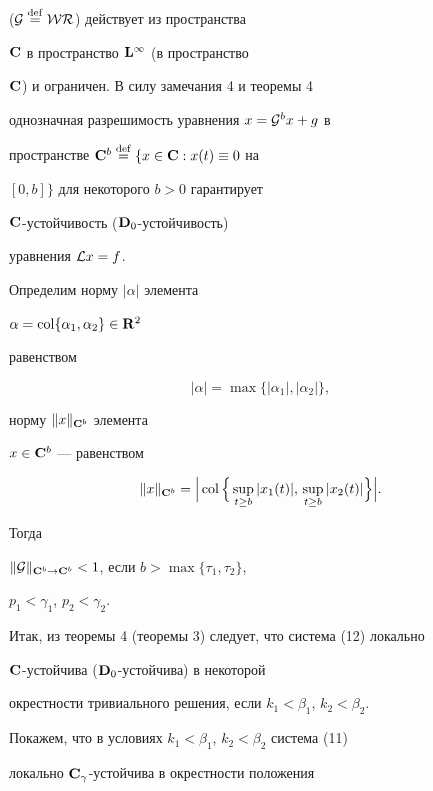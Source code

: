\begin{exam}
(${\cal G}\overset{\mathrm{def}}{=}{}{\cal W}{\cal R}$) действует из пространства


$\bold {C}$ в пространство $\bold {L}^{\infty}$ (в пространство


$\bold {C}$) и ограничен. В силу замечания 4 и теоремы 4 


\cite{1} однозначная разрешимость уравнения $x={\cal G}^bx+g$ в


пространстве $\bold {C}^b\overset{\mathrm{def}}{=}{} \{x\in\bold {C}:x(t)\equiv 0$ на


$[0,b]\}$ для некоторого $b>0$ гарантирует


$\bold {C}$-устойчивость ($\bold {D}_0$-устойчивость)


уравнения ${\cal L}x=f$.





Определим норму $|\alpha|$ элемента


$\alpha=\operatorname{col}\{\alpha_1,\alpha_2\}\in\bold {R}^2$


равенством


$$


|\alpha|=\max\{|\alpha_1|,|\alpha_2|\},


$$


норму $\|x\|_{\bold{C}^b}$ элемента


$x\in\bold {C}^b$ --- равенством


$$


\|x\|_{\bold{C}^b}=


\Big|\col\Big\{\sup\limits_{t\ge b}|x_1(t)|,


\,\sup\limits_{t\ge b}|x_2(t)|\Big\}\Big|.


$$


Тогда


$\|{\cal G}\|_{\bold{C}^b\to\bold{C}^b}<1$, если $b>\max\{\tau_1,\tau_2\}$,


$p_1<\gamma_1$, $p_2<\gamma_2$.





Итак, из теоремы 4 (теоремы 3) следует, что система (12) локально


$\bold {C}$-устойчива ($\bold {D}_0$-устойчива) в некоторой


окрестности тривиального решения, если $k_1<\beta_1$, $k_2<\beta_2$.





Покажем, что в условиях $k_1<\beta_1$, $k_2<\beta_2$ система (11)


локально $\bold {C}_\gamma$-устойчива в окрестности положения



\end{exam}
